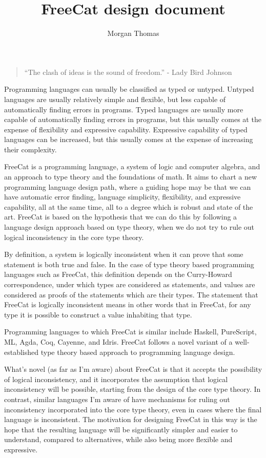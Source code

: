 \documentclass{article}
\title{FreeCat design document}
\author{Morgan Thomas}
\begin{document}
\maketitle

\begin{quote}
``The clash of ideas is the sound of freedom.'' - Lady Bird Johnson
\end{quote}

Programming languages can usually be classified as typed or untyped. Untyped languages are usually relatively simple and flexible, but less capable of automatically finding errors in programs. Typed languages are usually more capable of automatically finding errors in programs, but this usually comes at the expense of flexibility and expressive capability. Expressive capability of typed languages can be increased, but this usually comes at the expense of increasing their complexity.

FreeCat is a programming language, a system of logic and computer algebra, and an approach to type theory and the foundations of math. It aims to chart a new programming language design path, where a guiding hope may be that we can have automatic error finding, language simplicity, flexibility, and expressive capability, all at the same time, all to a degree which is robust and state of the art. FreeCat is based on the hypothesis that we can do this by following a language design approach based on type theory, when we do not try to rule out logical inconsistency in the core type theory.

By definition, a system is logically inconsistent when it can prove that some statement is both true and false. In the case of type theory based programming languages such as FreeCat, this definition depends on the Curry-Howard correspondence, under which types are considered as statements, and values are considered as proofs of the statements which are their types. The statement that FreeCat is logically inconsistent means in other words that in FreeCat, for any type it is possible to construct a value inhabiting that type.

Programming languages to which FreeCat is similar include Haskell, PureScript, ML, Agda, Coq, Cayenne, and Idris. FreeCat follows a novel variant of a well-established type theory based approach to programming language design.

What's novel (as far as I'm aware) about FreeCat is that it accepts the possibility of logical inconsistency, and it incorporates the assumption that logical inconsistency will be possible, starting from the design of the core type theory. In contrast, similar languages I'm aware of have mechanisms for ruling out inconsistency incorporated into the core type theory, even in cases where the final language is inconsistent. The motivation for designing FreeCat in this way is the hope that the resulting language will be significantly simpler and easier to understand, compared to alternatives, while also being more flexible and expressive.
\end{document}
